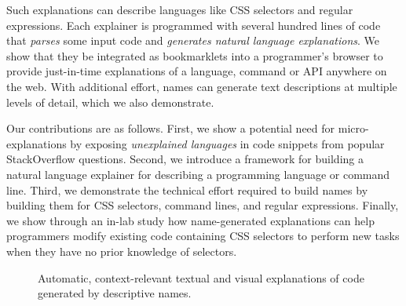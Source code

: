 Such explanations can describe languages like CSS selectors and regular expressions.
Each explainer is programmed with several hundred lines of code that \emph{parses} some input code and \emph{generates natural language explanations}.
We show that they be integrated as bookmarklets into a programmer's browser to provide just-in-time explanations of a language, command or API anywhere on the web.
With additional effort, \glspl{name} can generate text descriptions at multiple levels of detail, which we also demonstrate.

Our contributions are as follows.
First, we show a potential need for micro-explanations by exposing \emph{unexplained languages} in code snippets from popular StackOverflow questions.
Second, we introduce a framework for building a natural language explainer for describing a programming language or command line.
Third, we demonstrate the technical effort required to build \glspl{name} by building them for CSS selectors, command lines, and regular expressions.
Finally, we show through an in-lab study how \gls{name}-generated explanations can help programmers modify existing code containing CSS selectors to perform new tasks when they have no prior knowledge of selectors.

\begin{figure}[!t]
\label{fig:tutorons}
\caption{Automatic, context-relevant textual and visual explanations of code generated by descriptive \glspl{name}.}
\end{figure}
